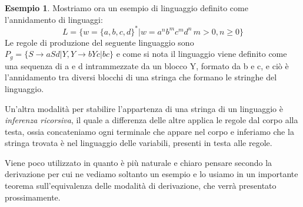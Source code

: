 \documentclass[a4paper]{report}
\theoremstyle{definition}%
\newtheorem*{esempio}{Esempio}
\begin{document}
  \begin{esempio}
    Mostriamo ora un esempio di linguaggio definito come l'annidamento di linguaggi:
    \begin{equation*}
      L = \{ w = \{a,b,c,d\}^* | w = a^nb^mc^md^n \, m > 0, n \geq 0\}
    \end{equation*}
    Le regole di produzione del seguente linguaggio sono $P_g = \{S \to aSd | Y, Y \to bYc | bc\}$
    e come si nota il linguaggio viene definito come una sequenza di a e d intrammezzate da un blocco Y, formato da b e c,
    e ciò è l'annidamento tra diversi blocchi di una stringa che formano le stringhe del linguaggio.
  \end{esempio}

  Un'altra modalità per stabilire l'appartenza di una stringa di un linguaggio è \emph{inferenza ricorsiva}, il quale a differenza delle altre
  applica le regole dal corpo alla testa, ossia concateniamo  ogni terminale che appare nel corpo e inferiamo che la stringa trovata
  è nel linguaggio delle variabili, presenti in testa alle regole.

  Viene poco utilizzato in quanto è più naturale e chiaro pensare secondo la derivazione per cui ne vediamo soltanto un esempio
  e lo usiamo in un importante teorema sull'equivalenza delle modalità di derivazione, che verrà presentato prossimamente.
\end{document}
